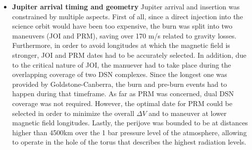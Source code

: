 \begin{itemize}
    \item \textbf{Jupiter arrival timing and geometry} Jupiter arrival and insertion was constrained by multiple aspects. First of all, since a direct injection into the science orbit would have been too expensive, the burn was split into two maneuvers (JOI and PRM), saving over 170 m/s \cite{launch_period} related to gravity losses. Furthermore, in order to avoid longitudes at which the magnetic field is stronger, JOI and PRM dates had to be accurately selected. In addition, due to the critical nature of JOI, the manuever had to take place during the overlapping coverage of two DSN complexes. Since the longest one was provided by Goldstone-Canberra, the burn and pre-burn events had to happen during that timeframe. As far as PRM was concerned, dual DSN coverage was not required. However, the optimal date for PRM could be selected in order to minimize the overall $\Delta V$ and to maneuver at lower magnetic field longitudes. Lastly, the perijove was bounded to be at distances higher than 4500km over the 1 bar pressure level of the atmosphere, allowing to operate in the hole of the torus that describes the highest radiation levels.
\end{itemize}
